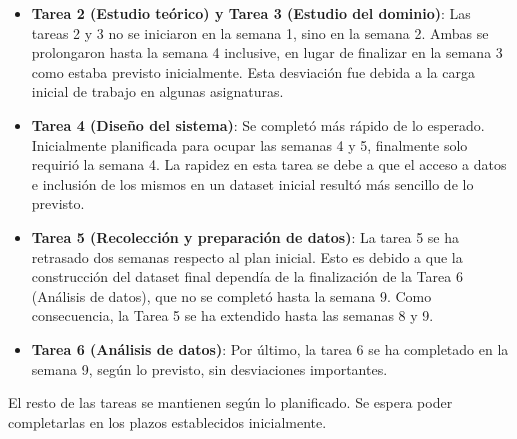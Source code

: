 \begin{itemize}
    \item \textbf{Tarea 2 (Estudio teórico) y Tarea 3 (Estudio del dominio)}: Las tareas 2 y 3 no se iniciaron en la semana 1, sino en la semana 2. Ambas se prolongaron hasta la semana 4 inclusive, en lugar de finalizar en la semana 3 como estaba previsto inicialmente. Esta desviación fue debida a la carga inicial de trabajo en algunas asignaturas.
    
    \item \textbf{Tarea 4 (Diseño del sistema)}: Se completó más rápido de lo esperado. Inicialmente planificada para ocupar las semanas 4 y 5, finalmente solo requirió la semana 4. La rapidez en esta tarea se debe a que el acceso a datos e inclusión de los mismos en un dataset inicial resultó más sencillo de lo previsto.
    
    \item \textbf{Tarea 5 (Recolección y preparación de datos)}: La tarea 5 se ha retrasado dos semanas respecto al plan inicial. Esto es debido a que la construcción del dataset final dependía de la finalización de la Tarea 6 (Análisis de datos), que no se completó hasta la semana 9. Como consecuencia, la Tarea 5 se ha extendido hasta las semanas 8 y 9.
    
    \item \textbf{Tarea 6 (Análisis de datos)}: Por último, la tarea 6 se ha completado en la semana 9, según lo previsto, sin desviaciones importantes.
\end{itemize}

El resto de las tareas se mantienen según lo planificado. Se espera poder completarlas en los plazos establecidos inicialmente.
